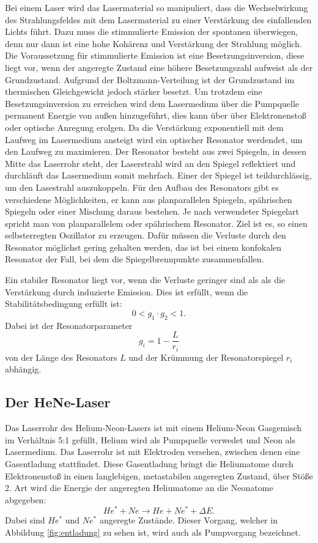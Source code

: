 Bei einem Laser wird das Lasermaterial so manipuliert, dass die Wechselwirkung des Strahlungsfeldes
mit dem Lasermaterial zu einer Verstärkung des einfallenden Lichts führt. Dazu muss die stimmulierte
Emission der spontanen überwiegen, denn nur dann ist eine hohe Kohärenz und Verstärkung der Strahlung möglich.
Die Voraussetzung für stimmulierte Emission ist eine Besetzungsinversion, diese liegt vor, wenn der angeregte Zustand
eine höhere Besetzungszahl aufweist als der Grundzustand. Aufgrund der Boltzmann-Verteilung ist der Grundzustand im
thermischen Gleichgewicht jedoch stärker besetzt. Um trotzdem eine Besetzungsinversion zu erreichen wird dem
Lasermedium über die Pumpquelle permanent Energie von außen hinzugeführt, dies kann über über Elektronenstoß
oder optische Anregung erolgen.
Da die Verstärkung exponentiell mit dem Laufweg im Lasermedium ansteigt wird ein optischer Resonator werdendet, um den
Laufweg zu maximieren. Der Resonator besteht aus zwei Spiegeln, in dessen Mitte das Laserrohr steht, der Laserstrahl wird an
den Spiegel reflektiert und durchläuft das Lasermedium somit mehrfach. Einer der Spiegel ist teildurchlässig, um den Lasestrahl
auszukoppeln. Für den Aufbau des Resonators gibt es verschiedene Möglichkeiten, er kann aus planparallelen Spiegeln, spährischen
Spiegeln oder einer Mischung daraus bestehen. Je nach verwendeter Spiegelart spricht man von planparallelem oder spährischem
Resonator. Ziel ist es, so einen selbsterregten Oszillator zu erzeugen. Dafür müssen die Verluste durch den Resonator möglichst gering
gehalten werden, das ist bei einem konfokalen Resonator der Fall, bei dem die Spiegelbrennpunkte zusammenfallen.

Ein stabiler Resonator liegt vor, wenn die Verluste geringer sind als als die Verstärkung durch induzierte Emission.
Dies ist erfüllt, wenn die Stabilitätsbedingung erfüllt ist:
\begin{equation}
  0< g_1 \cdot g_2 <1.
\end{equation}
Dabei ist der Resonatorparameter
\begin{equation}
  g_i = 1- \frac{L}{r_i}
\end{equation}
von der Länge des Resonators $L$ und der Krümmung der Resonatorspiegel $r_i$ abhängig.

\subsection{Der HeNe-Laser}
Das Laserrohr des Helium-Neon-Lasers ist mit einem Helium-Neon Gasgemisch im Verhältnis 5:1 gefüllt,
Helium wird als Pumpquelle verwedet und Neon als Lasermedium. Das Laserrohr ist mit Elektroden versehen,
zwischen denen eine Gasentladung stattfindet. Diese Gasentladung bringt die Heliumatome durch Elektronenstoß in einen
langlebigen, metastabilen angeregten Zustand, über Stöße 2. Art wird die Energie der angeregten Heliumatome an die
Neonatome abgegeben:
\begin{equation}
  He^* + Ne \rightarrow He + Ne^* + \Delta E.
\end{equation}
Dabei sind $He^*$ und $Ne^*$ angeregte Zustände. Dieser Vorgang, welcher in Abbildung \ref{fig:entladung} zu sehen ist,
wird auch als Pumpvorgang bezeichnet.

